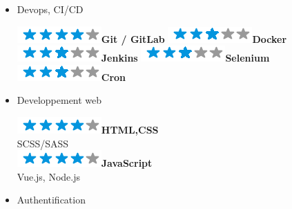 \documentclass[]{friggeri-cv}
\begin{document}
\begin{flushleft}
\begin{multicols}{3}
\begin{itemize}
\columnbreak
\item \large Devops, CI/CD \
\normalsize
\begin{flushleft}

\includegraphics[scale=0.40]{res/img/4stars.png}\hspace{1.5mm}\textbf{Git / GitLab}
\includegraphics[scale=0.40]{res/img/3stars.png}\hspace{1.5mm}\textbf{Docker}
\includegraphics[scale=0.40]{res/img/3stars.png}\hspace{1.5mm}\textbf{Jenkins}
\includegraphics[scale=0.40]{res/img/3stars.png}\hspace{1.5mm}\textbf{Selenium}
\includegraphics[scale=0.40]{res/img/3stars.png}\hspace{1.5mm}\textbf{Cron}
\end{flushleft}            

\item \large Developpement web \
\normalsize
\begin{flushleft}

\includegraphics[scale=0.40]{res/img/4stars.png}\hspace{1.5mm}\textbf{HTML,CSS}\\SCSS/SASS\\
\includegraphics[scale=0.40]{res/img/4stars.png}\hspace{1.5mm}\textbf{JavaScript}\\Vue.js, Node.js\\
\end{flushleft}            

\item \large Authentification \
\normalsize
\begin{flushleft}


\end{flushleft}
\end{itemize}
\end{multicols}
\end{flushleft}
\end{document}
